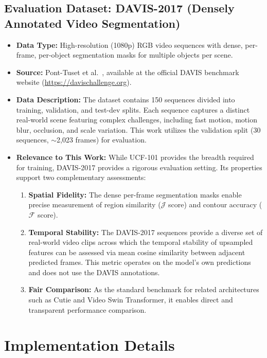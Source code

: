 \subsection*{Evaluation Dataset: DAVIS-2017 (Densely Annotated Video Segmentation)}
\begin{itemize}
    \item \textbf{Data Type:} High-resolution (1080p) RGB video sequences with dense, per-frame, per-object segmentation masks for multiple objects per scene.
    \item \textbf{Source:} Pont-Tuset et al.~\cite{davis2017}, available at the official DAVIS benchmark website (\url{https://davischallenge.org}). 
    \item \textbf{Data Description:} The dataset contains 150 sequences divided into training, validation, and test-dev splits. Each sequence captures a distinct real-world scene featuring complex challenges, including fast motion, motion blur, occlusion, and scale variation. This work utilizes the validation split (30 sequences, $\sim$2,023 frames) for evaluation.
    \item \textbf{Relevance to This Work:} While UCF-101 provides the breadth required for training, DAVIS-2017 provides a rigorous evaluation setting. Its properties support two complementary assessments:
    \begin{enumerate}
        \item \textbf{Spatial Fidelity:} The dense per-frame segmentation masks enable precise measurement of region similarity ($\mathcal{J}$ score) and contour accuracy ($\mathcal{F}$ score).
        \item \textbf{Temporal Stability:} The DAVIS-2017 sequences provide a diverse set of real-world video clips across which the temporal stability of upsampled features can be assessed via mean cosine similarity between adjacent predicted frames. This metric operates on the model's own predictions and does not use the DAVIS annotations.
        \item \textbf{Fair Comparison:} As the standard benchmark for related architectures such as Cutie and Video Swin Transformer, it enables direct and transparent performance comparison.
    \end{enumerate}
\end{itemize}

\section{Implementation Details}

